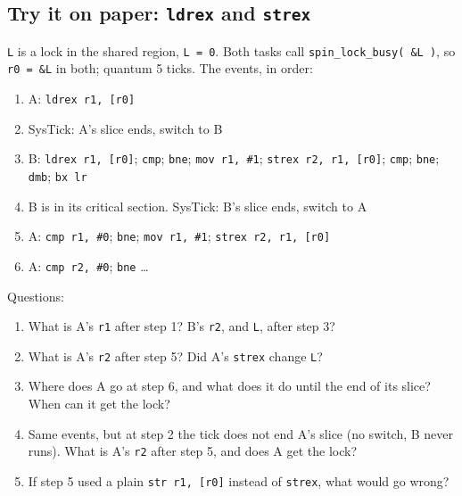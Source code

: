 \subsection{Try it on paper: \texttt{ldrex} and \texttt{strex}}
\texttt{L} is a lock in the shared region, \texttt{L = 0}. Both tasks call \texttt{spin\_lock\_busy( \&L )}, so \texttt{r0 = \&L} in both; quantum 5 ticks. The events, in order:
\begin{enumerate}
    \item A: \texttt{ldrex r1, [r0]}
    \item SysTick: A's slice ends, switch to B
    \item B: \texttt{ldrex r1, [r0]}; \texttt{cmp}; \texttt{bne}; \texttt{mov r1, \#1}; \texttt{strex r2, r1, [r0]}; \texttt{cmp}; \texttt{bne}; \texttt{dmb}; \texttt{bx lr}
    \item B is in its critical section. SysTick: B's slice ends, switch to A
    \item A: \texttt{cmp r1, \#0}; \texttt{bne}; \texttt{mov r1, \#1}; \texttt{strex r2, r1, [r0]}
    \item A: \texttt{cmp r2, \#0}; \texttt{bne} \dots
\end{enumerate}
Questions:
\begin{enumerate}
    \item What is A's \texttt{r1} after step 1? B's \texttt{r2}, and \texttt{L}, after step 3?
    \item What is A's \texttt{r2} after step 5? Did A's \texttt{strex} change \texttt{L}?
    \item Where does A go at step 6, and what does it do until the end of its slice? When can it get the lock?
    \item Same events, but at step 2 the tick does not end A's slice (no switch, B never runs). What is A's \texttt{r2} after step 5, and does A get the lock?
    \item If step 5 used a plain \texttt{str r1, [r0]} instead of \texttt{strex}, what would go wrong?
\end{enumerate}

